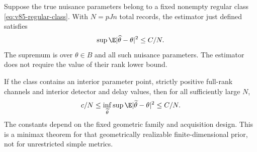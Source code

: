 \begin{theorem}\label{thm:v85-parametric-risk}
Suppose the true nuisance parameters belong to a fixed nonempty
regular class \eqref{eq:v85-regular-class}. With $N=pJn$ total
records, the estimator just defined satisfies
\begin{equation}\label{eq:v85-parametric-upper}
                    \sup\E|\widehat\theta-\theta|^2\le C/N.
\end{equation}
The supremum is over $\theta\in B$ and all such nuisance parameters.
The estimator does not require the value of their rank lower bound.

If the class contains an interior parameter point, strictly positive
full-rank channels and interior detector and delay values, then for
all sufficiently large $N$,
\begin{equation}\label{eq:v85-parametric-minimax}
       c/N\le\inf_{\widetilde\theta}\sup
                 \E|\widetilde\theta-\theta|^2\le C/N.
\end{equation}
The constants depend on the fixed geometric family and acquisition
design. This is a minimax theorem for that geometrically realizable
finite-dimensional prior, not for unrestricted simple metrics.
\end{theorem}
